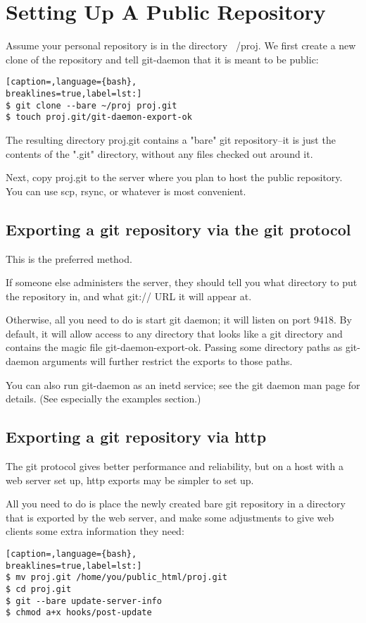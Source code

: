 \section{Setting Up A Public Repository}
Assume your personal repository is in the directory ~/proj. We first create a
new clone of the repository and tell git-daemon that it is meant to be public:
\lstset{basicstyle=\scriptsize, numbers=none, captionpos=b, tabsize=4}
\begin{lstlisting}[caption=,language={bash},
breaklines=true,label=lst:]
$ git clone --bare ~/proj proj.git
$ touch proj.git/git-daemon-export-ok
\end{lstlisting}

The resulting directory proj.git contains a "bare" git repository--it is just
the contents of the ".git" directory, without any files checked out around it.

Next, copy proj.git to the server where you plan to host the public repository.
You can use scp, rsync, or whatever is most convenient.

\subsection{Exporting a git repository via the git protocol}
This is the preferred method.

If someone else administers the server, they should tell you what directory to
put the repository in, and what git:// URL it will appear at.

Otherwise, all you need to do is start git daemon; it will listen on port 9418.
By default, it will allow access to any directory that looks like a git
directory and contains the magic file git-daemon-export-ok. Passing some
directory paths as git-daemon arguments will further restrict the exports to
those paths.

You can also run git-daemon as an inetd service; see the git daemon man page
for details. (See especially the examples section.)

\subsection{Exporting a git repository via http}
The git protocol gives better performance and reliability, but on a host with a
web server set up, http exports may be simpler to set up.

All you need to do is place the newly created bare git repository in a
directory that is exported by the web server, and make some adjustments to give
web clients some extra information they need:
\lstset{basicstyle=\scriptsize, numbers=none, captionpos=b, tabsize=4}
\begin{lstlisting}[caption=,language={bash},
breaklines=true,label=lst:]
$ mv proj.git /home/you/public_html/proj.git
$ cd proj.git
$ git --bare update-server-info
$ chmod a+x hooks/post-update
\end{lstlisting}

